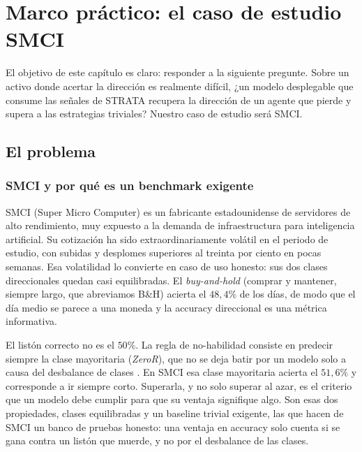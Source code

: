 \chapter{Marco práctico: el caso de estudio SMCI}
\label{cap:marco-practico}


El objetivo de este capítulo es claro: responder a la siguiente pregunte. Sobre un activo donde acertar la dirección es realmente difícil, ¿un modelo desplegable que consume las señales de STRATA recupera la dirección de un agente que pierde y supera a las estrategias triviales? Nuestro caso de estudio será SMCI. 

\section{El problema}
\label{sec:smci-banco}

\subsection{SMCI y por qué es un benchmark exigente}
\label{sec:smci-activo}

SMCI (Super Micro Computer) es un fabricante estadounidense de servidores de alto rendimiento, muy expuesto a la demanda de infraestructura para inteligencia artificial. Su cotización ha sido extraordinariamente volátil en el periodo de estudio, con subidas y desplomes superiores al treinta por ciento en pocas semanas. Esa volatilidad lo convierte en caso de uso honesto: sus dos clases direccionales quedan casi equilibradas. El \emph{buy-and-hold} (comprar y mantener, siempre largo, que abreviamos B\&H) acierta el $48{,}4\%$ de los días, de modo que el día medio se parece a una moneda y la accuracy direccional es una métrica informativa.

El listón correcto no es el $50\%$. La regla de no-habilidad consiste en predecir siempre la clase mayoritaria (\emph{ZeroR}), que no se deja batir por un modelo solo a causa del desbalance de clases \cite{witten2016datamining, kuhn2008caret}. En SMCI esa clase mayoritaria acierta el $51{,}6\%$ y corresponde a ir siempre corto. Superarla, y no solo superar al azar, es el criterio que un modelo debe cumplir para que su ventaja signifique algo. Son esas dos propiedades, clases equilibradas y un baseline trivial exigente, las que hacen de SMCI un banco de pruebas honesto: una ventaja en accuracy solo cuenta si se gana contra un listón que muerde, y no por el desbalance de las clases.

